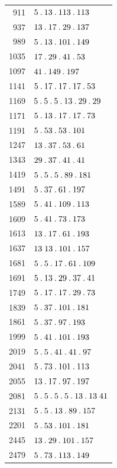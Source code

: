 %
\begingroup\small\setlength{\tabcolsep}{5pt}
\begin{longtable}{@{}r|l@{}}
911 & $5\mathbin{.} 13\mathbin{.} 113\mathbin{.} 113$\\
937 & $13\mathbin{.} 17\mathbin{.} 29\mathbin{.} 137$\\
989 & $5\mathbin{.} 13\mathbin{.} 101\mathbin{.} 149$\\
1035 & $17\mathbin{.} 29\mathbin{.} 41\mathbin{.} 53$\\
1097 & $41\mathbin{.} 149\mathbin{.} 197$\\
1141 & $5\mathbin{.} 17\mathbin{.} 17\mathbin{.} 17\mathbin{.} 53$\\
1169 & $5\mathbin{.} 5\mathbin{.} 5\mathbin{.} 13\mathbin{.} 29\mathbin{.} 29$\\
1171 & $5\mathbin{.} 13\mathbin{.} 17\mathbin{.} 17\mathbin{.} 73$\\
1191 & $5\mathbin{.} 53\mathbin{.} 53\mathbin{.} 101$\\
1247 & $13\mathbin{.} 37\mathbin{.} 53\mathbin{.} 61$\\
1343 & $29\mathbin{.} 37\mathbin{.} 41\mathbin{.} 41$\\
1419 & $5\mathbin{.} 5\mathbin{.} 5\mathbin{.} 89\mathbin{.} 181$\\
1491 & $5\mathbin{.} 37\mathbin{.} 61\mathbin{.} 197$\\
1589 & $5\mathbin{.} 41\mathbin{.} 109\mathbin{.} 113$\\
1609 & $5\mathbin{.} 41\mathbin{.} 73\mathbin{.} 173$\\
1613 & $13\mathbin{.} 17\mathbin{.} 61\mathbin{.} 193$\\
1637 & $13\;13\mathbin{.} 101\mathbin{.} 157$\\
1681 & $5\mathbin{.} 5\mathbin{.} 17\mathbin{.} 61\mathbin{.} 109$\\
1691 & $5\mathbin{.} 13\mathbin{.} 29\mathbin{.} 37\mathbin{.} 41$\\
1749 & $5\mathbin{.} 17\mathbin{.} 17\mathbin{.} 29\mathbin{.} 73$\\
1839 & $5\mathbin{.} 37\mathbin{.} 101\mathbin{.} 181$\\
1861 & $5\mathbin{.} 37\mathbin{.} 97\mathbin{.} 193$\\
1999 & $5\mathbin{.} 41\mathbin{.} 101\mathbin{.} 193$\\
2019 & $5\mathbin{.} 5\mathbin{.} 41\mathbin{.} 41\mathbin{.} 97$\\
2041 & $5\mathbin{.} 73\mathbin{.} 101\mathbin{.} 113$\\
2055 & $13\mathbin{.} 17\mathbin{.} 97\mathbin{.} 197$\\
2081 & $5\mathbin{.} 5\mathbin{.} 5\mathbin{.} 5\mathbin{.} 13\mathbin{.} 13\;41$\\
2131 & $5\mathbin{.} 5\mathbin{.} 13\mathbin{.} 89\mathbin{.} 157$\\
2201 & $5\mathbin{.} 53\mathbin{.} 101\mathbin{.} 181$\\
2445 & $13\mathbin{.} 29\mathbin{.} 101\mathbin{.} 157$\\
2479 & $5\mathbin{.} 73\mathbin{.} 113\mathbin{.} 149$\\

\end{longtable}
